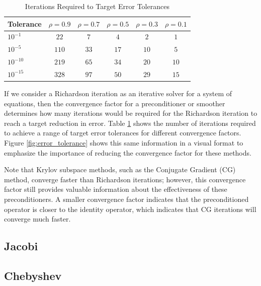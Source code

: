 \begin{table}[ht!]
\begin{center}
\begin{tabular}{l c c c c c}
  \toprule
  Tolerance   &  $\rho = 0.9$  &  $\rho = 0.7$  &  $\rho = 0.5$  &  $\rho = 0.3$  &  $\rho = 0.1$  \\
  \toprule
  $10^{-1}$   &  $22$          &  $7$           &  $4$           & $2$            &  $1$           \\
  $10^{-5}$   &  $110$         &  $33$          &  $17$          & $10$           &  $5$           \\
  $10^{-10}$  &  $219$         &  $65$          &  $34$          & $20$           &  $10$          \\
  $10^{-15}$  &  $328$         &  $97$          &  $50$          & $29$           &  $15$          \\
  \bottomrule
\end{tabular}
\end{center}
\caption{Iterations Required to Target Error Tolerances}
\label{table:error_tolerance}
\end{table}

If we consider a Richardson iteration as an iterative solver for a system of equations, then the convergence factor for a preconditioner or smoother determines how many iterations would be required for the Richardson iteration to reach a target reduction in error.
Table \ref{table:error_tolerance} shows the number of iterations required to achieve a range of target error tolerances for different convergence factors.
Figure \ref{fig:error_tolerance} shows this same information in a visual format to emphasize the importance of reducing the convergence factor for these methods.

Note that Krylov subspace methods, such as the Conjugate Gradient (CG) method, converge faster than Richardson iterations; however, this convergence factor still provides valuable information about the effectiveness of these preconditioners.
A smaller convergence factor indicates that the preconditioned operator is closer to the identity operator, which indicates that CG iterations will converge much faster.

\subsection{Jacobi}


\subsection{Chebyshev}
